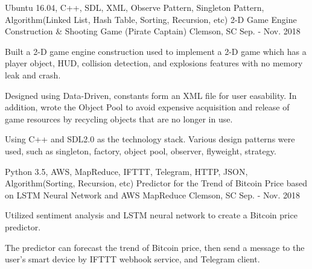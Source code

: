

\begin{cventries}



  \cventry
    {Ubuntu 16.04, C++, SDL, XML, Observe Pattern, Singleton Pattern, Algorithm(Linked List, Hash Table, Sorting, Recursion, etc)} %
    {2-D Game Engine Construction \& Shooting Game (Pirate Captain)} %
    {Clemson, SC} %
    {Sep. - Nov. 2018}  %
    {
      \begin{cvitems} %
        \item {Built a 2-D game engine construction used to implement a 2-D game which has a player object, HUD, collision detection, and explosions features with no memory leak and crash.}
        \item {Designed using Data-Driven, constants form an XML file for user easability. In addition, wrote the Object Pool to avoid expensive acquisition and release of game resources by recycling objects that are no longer in use.}
        \item {Using C++ and SDL2.0 as the technology stack. Various design patterns were used, such as singleton, factory, object pool, observer, flyweight, strategy.}
      \end{cvitems}
    }

  \cventry
    {Python 3.5, AWS, MapReduce, IFTTT, Telegram, HTTP, JSON, Algorithm(Sorting, Recursion, etc)} %
    {Predictor for the Trend of Bitcoin Price based on LSTM Neural Network and AWS MapReduce}
    {Clemson, SC} %
    {Sep. - Nov. 2018} %
    {
      \begin{cvitems} %
        \item {Utilized sentiment analysis and LSTM neural network to create a Bitcoin price predictor.}
        \item {The predictor can forecast the trend of Bitcoin price, then send a message to the user's smart device by IFTTT webhook service, and Telegram client.}
      \end{cvitems}
    }



\end{cventries}
